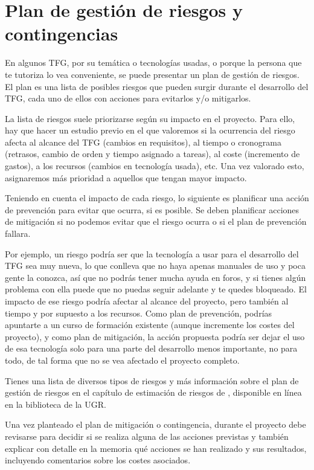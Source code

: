 \section{Plan de gestión de riesgos y contingencias}

En algunos TFG, por su temática o tecnologías usadas, o porque la persona que te tutoriza lo vea conveniente, se puede presentar un plan de gestión de riesgos. El plan es una lista de posibles riesgos que pueden surgir durante el desarrollo del TFG, cada uno de ellos con acciones para evitarlos y/o mitigarlos. 

La lista de riesgos suele priorizarse según su impacto en el proyecto. Para ello, hay que hacer un estudio previo en el que valoremos si la ocurrencia del riesgo afecta al alcance del TFG (cambios en requisitos), al tiempo o cronograma (retrasos, cambio de orden y tiempo asignado a tareas), al coste (incremento de gastos), a los recursos (cambios en tecnología usada), etc. Una vez valorado esto, asignaremos más prioridad a aquellos que tengan mayor impacto. 

Teniendo en cuenta el impacto de cada riesgo, lo siguiente es planificar una acción de prevención para evitar que ocurra, si es posible. Se deben planificar acciones de mitigación si no podemos evitar que el riesgo ocurra o si el plan de prevención fallara.

Por ejemplo, un riesgo podría ser que la tecnología a usar para el desarrollo del TFG sea muy nueva, lo que conlleva que no haya apenas manuales de uso y poca gente la conozca, así que no podrás tener mucha ayuda en foros, y  si tienes algún problema con ella puede que no puedas seguir adelante y te quedes bloqueado. El impacto de ese riesgo podría afectar al alcance del proyecto, pero también al tiempo y por supuesto a los recursos. Como plan de prevención, podrías apuntarte a un curso de formación existente (aunque incremente los costes del proyecto), y como plan de mitigación, la acción propuesta podría ser dejar el uso de esa tecnología solo para una parte del desarrollo menos importante, no para todo, de tal forma que no se vea afectado el proyecto completo.

Tienes una lista de diversos tipos de riesgos y más información sobre el plan de gestión de riesgos en el capítulo de estimación de riesgos de \cite{guerin2018gestion}, disponible en línea en la biblioteca de la UGR.

Una vez planteado el plan de mitigación o contingencia, durante el proyecto debe revisarse para decidir si se realiza alguna de las acciones previstas y también explicar con detalle en la memoria qué acciones se han realizado y sus resultados, incluyendo comentarios sobre los costes asociados.

